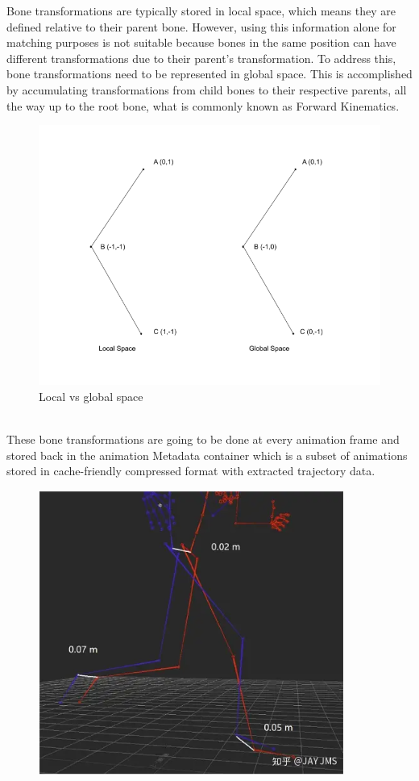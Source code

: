 \documentclass[12pt]{book}
\begin{document}
\begin{itemize}
          Bone transformations are typically stored in local space, which means they are defined relative to
          their parent bone. However, using this information alone for matching purposes is not suitable
          because bones in the same position can have different transformations due to their parent’s
          transformation. To address this, bone transformations need to be represented in global space.
          This is accomplished by accumulating transformations from child bones to their respective
          parents, all the way up to the root bone, what is commonly known as Forward Kinematics.
          \begin{figure}[!h]
              \centering
              \includegraphics[scale=0.4]{./Figures/Images/LocalGlobalSpace.png}
              \caption{Local vs global space}
              \label{Local vs global space}
          \end{figure}\\
          These bone transformations are going to be done at every animation frame and stored back
          in the animation Metadata container which is a subset of animations stored in cache-friendly
          compressed format with extracted trajectory data.
          \begin{figure}[!h]
              \centering
              \includegraphics[scale=0.7]{./Figures/Images/poseConpare.PNG}

\end{figure}
\end{itemize}
\end{document}
